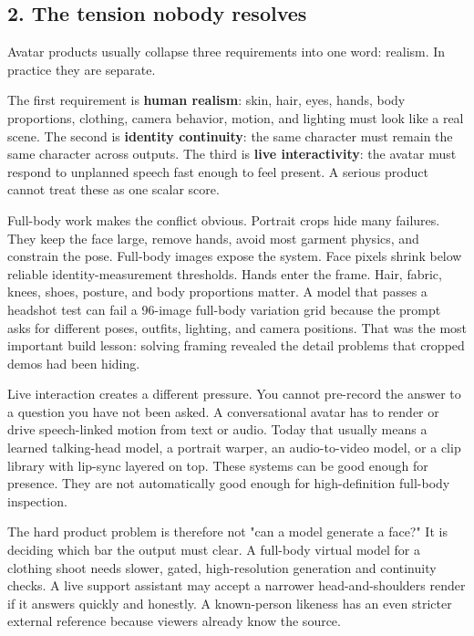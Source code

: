 \documentclass[
]{article}
\begin{document}
\subsection{2. The tension nobody
resolves}\label{2-the-tension-nobody-resolves}

Avatar products usually collapse three requirements into one word:
realism. In practice they are separate.

The first requirement is \textbf{human realism}: skin, hair, eyes,
hands, body proportions, clothing, camera behavior, motion, and lighting
must look like a real scene. The second is \textbf{identity continuity}:
the same character must remain the same character across outputs. The
third is \textbf{live interactivity}: the avatar must respond to
unplanned speech fast enough to feel present. A serious product cannot
treat these as one scalar score.

Full-body work makes the conflict obvious. Portrait crops hide many
failures. They keep the face large, remove hands, avoid most garment
physics, and constrain the pose. Full-body images expose the system.
Face pixels shrink below reliable identity-measurement thresholds. Hands
enter the frame. Hair, fabric, knees, shoes, posture, and body
proportions matter. A model that passes a headshot test can fail a
96-image full-body variation grid because the prompt asks for different
poses, outfits, lighting, and camera positions. That was the most
important build lesson: solving framing revealed the detail problems
that cropped demos had been hiding.

Live interaction creates a different pressure. You cannot pre-record the
answer to a question you have not been asked. A conversational avatar
has to render or drive speech-linked motion from text or audio. Today
that usually means a learned talking-head model, a portrait warper, an
audio-to-video model, or a clip library with lip-sync layered on top.
These systems can be good enough for presence. They are not
automatically good enough for high-definition full-body inspection.

The hard product problem is therefore not "can a model generate a face?"
It is deciding which bar the output must clear. A full-body virtual
model for a clothing shoot needs slower, gated, high-resolution
generation and continuity checks. A live support assistant may accept a
narrower head-and-shoulders render if it answers quickly and honestly. A
known-person likeness has an even stricter external reference because
viewers already know the source.
\end{document}
